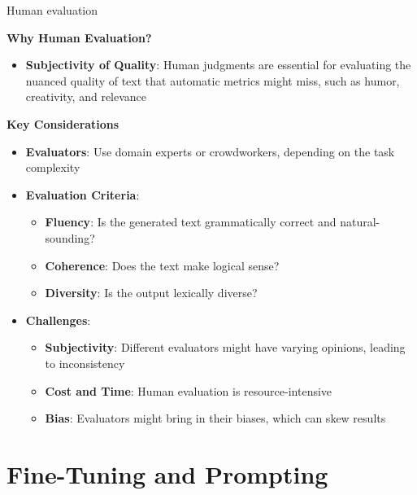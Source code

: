 \begin{vbframe}{Human evaluation}

\textbf{Why Human Evaluation?}
\begin{itemize}
    \item \textbf{Subjectivity of Quality}: Human judgments are essential for evaluating the nuanced quality of text that automatic metrics might miss, such as humor, creativity, and relevance
\end{itemize}

\textbf{Key Considerations}
\begin{itemize}
    \item \textbf{Evaluators}: Use domain experts or crowdworkers, depending on the task complexity
    \item \textbf{Evaluation Criteria}:
    \begin{itemize}
        \item \textbf{Fluency}: Is the generated text grammatically correct and natural-sounding?
        \item \textbf{Coherence}: Does the text make logical sense?
        \item \textbf{Diversity}: Is the output lexically diverse?
    \end{itemize}
    \item \textbf{Challenges}: 
    \begin{itemize}
        \item \textbf{Subjectivity}: Different evaluators might have varying opinions, leading to inconsistency
        \item \textbf{Cost and Time}: Human evaluation is resource-intensive
        \item \textbf{Bias}: Evaluators might bring in their biases, which can skew results
    \end{itemize}
\end{itemize}
   
\end{vbframe}



\section{Fine-Tuning and Prompting}

